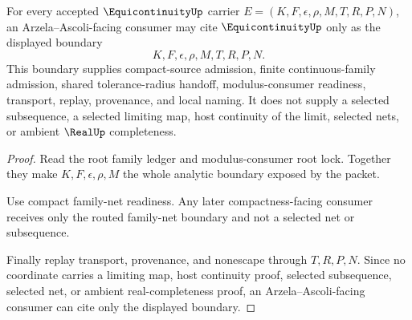 \begin{theorem}
\label{thm:equicontinuity-arzela-ascoli-boundary-readiness}
For every accepted $\EquicontinuityUp$ carrier $E=(K,F,\epsilon,\rho,M,T,R,P,N)$, an Arzela--Ascoli-facing consumer may cite $\EquicontinuityUp$ only as the displayed boundary
$$
K,F,\epsilon,\rho,M,T,R,P,N .
$$
This boundary supplies compact-source admission, finite continuous-family admission, shared tolerance-radius handoff, modulus-consumer readiness, transport, replay, provenance, and local naming. It does not supply a selected subsequence, a selected limiting map, host continuity of the limit, selected nets, or ambient $\RealUp$ completeness.
\end{theorem}
\begin{proof}
Read the root family ledger and modulus-consumer root lock. Together they make $K,F,\epsilon,\rho,M$ the whole analytic boundary exposed by the packet.

Use compact family-net readiness. Any later compactness-facing consumer receives only the routed family-net boundary and not a selected net or subsequence.

Finally replay transport, provenance, and nonescape through $T,R,P,N$. Since no coordinate carries a limiting map, host continuity proof, selected subsequence, selected net, or ambient real-completeness proof, an Arzela--Ascoli-facing consumer can cite only the displayed boundary.
\end{proof}

